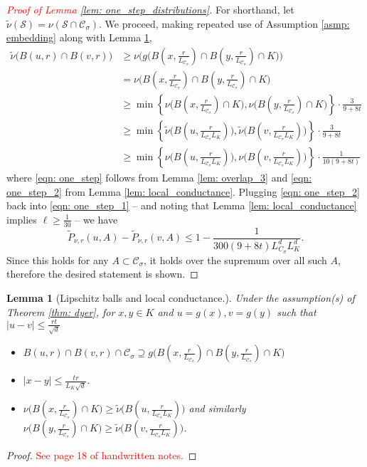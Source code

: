 \documentclass{article}
\newcommand{\abs}[1]{\left \lvert #1 \right \rvert}
\newcommand{\Cset}{\mathcal{C}}
\newcommand{\Sset}{\mathcal{S}}
\newcommand{\Csig}{\Cset_{\sigma}}
\newcommand{\1}{\mathbf{1}}
\theoremstyle{alden}
\theoremstyle{aldenthm}
\newtheorem{lemma}{Lemma}
\theoremstyle{remark}
\begin{document}
\begin{proof}[\textcolor{red}{Proof of Lemma \ref{lem: one_step_distributions}}]
	For shorthand, let $\widetilde{\nu}(\Sset) = \nu(\Sset \cap \Csig)$. We proceed, making repeated use of Assumption \ref{asmp: embedding} along with Lemma \ref{lem: lipschitz_balls_local_conductance},
	\begin{align}
	\widetilde{\nu} \biggl( B(u,r) \cap B(v,r) \biggr) & \geq \nu \Biggl(  g\biggl(B(x, \frac{r}{L_{\Csig}}) \cap B(y, \frac{r}{L_{\Csig}}) \cap K  \biggr) \Biggr) \nonumber \\
	& = \nu \biggl(B(x, \frac{r}{L_{\Csig}}) \cap B(y, \frac{r}{L_{\Csig}}) \cap K  \biggr) \nonumber \\
	& \geq \min \left\{ \nu\biggl( B(x, \frac{r}{L_{\Csig}}) \cap K \biggr), \nu\biggl( B(y, \frac{r}{L_{\Csig}}) \cap K \biggr)  \right\} \cdot \frac{3}{9 + 8t} \label{eqn: one_step}\\
	& \geq \min \left\{ \widetilde{\nu} \biggl( B(u, \frac{r}{L_{\Csig} L_K}) \biggr), \widetilde{\nu} \biggl( B(v, \frac{r}{L_{\Csig} L_K}) \biggr)  \right\} \cdot \frac{3}{9 + 8t} \nonumber \\
	& \geq \min \left\{ \nu \biggl( B(u, \frac{r}{L_{\Csig} L_K}) \biggr), \nu \biggl( B(v, \frac{r}{L_{\Csig} L_K}) \biggr)  \right\} \cdot \frac{1}{10(9 + 8t)} \label{eqn: one_step_2}
	\end{align}
	where \eqref{eqn: one_step} follows from Lemma \ref{lem: overlap_3} and \eqref{eqn: one_step_2} from Lemma \ref{lem: local_conductance}. Plugging \eqref{eqn: one_step_2} back into \eqref{eqn: one_step_1} -- and noting that Lemma \ref{lem: local_conductance} implies $\ell \geq \frac{1}{30}$ -- we have
	\begin{equation*}
	\widetilde{P}_{\nu,r}(u,A) - \widetilde{P}_{\nu,r}(v,A) \leq 1 - \frac{1}{300(9 + 8t)L_{C_{\sigma}}^d L_{K}^d}.
	\end{equation*}
	Since this holds for any $A \subset \Csig$, it holds over the supremum over all such $A$, therefore the desired statement is shown.
\end{proof}

\begin{lemma}[Lipschitz balls and local conductance.]
	\label{lem: lipschitz_balls_local_conductance}
	Under the assumption(s) of Theorem \ref{thm: dyer}, for $x,y \in K$ and $u = g(x), v = g(y)$ such that $\abs{u -v} \leq \frac{rt}{\sqrt{d}}$
	\begin{itemize}
		\item $B(u,r) \cap B(v,r) \cap \Csig \supseteq g\biggl(B(x, \frac{r}{L_{\Csig}}) \cap B(y, \frac{r}{L_{\Csig}}) \cap K  \biggr)$
		\item $\abs{x - y} \leq \frac{tr}{L_{K} \sqrt{d}}$.
		\item $\nu\biggl( B(x, \frac{r}{L_{\Csig}}) \cap K \biggr) \geq \widetilde{\nu} \biggl( B(u, \frac{r}{L_{\Csig} L_K}) \biggr)$ and similarly $\nu\biggl( B(y, \frac{r}{L_{\Csig}}) \cap K \biggr) \geq \widetilde{\nu} \biggl( B(v, \frac{r}{L_{\Csig} L_K}) \biggr)$.
	\end{itemize}
\end{lemma}
\begin{proof}
	\textcolor{red}{See page 18 of handwritten notes.}
\end{proof}
\end{document}
